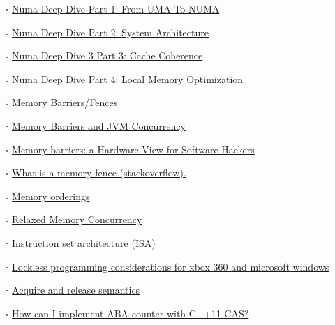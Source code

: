 \documentclass[openany, a4paper]{book}
\theoremstyle{break}
\theoremstyle{example}
\theoremstyle{note}
\theoremstyle{break}
\theoremstyle{exercise}
\begin{document}
\begin{itemize}
\item[{$\square$}] \href{https://frankdenneman.nl/2016/07/07/numa-deep-dive-part-1-uma-numa/}{Numa Deep Dive Part 1: From UMA To NUMA}
\item[{$\square$}] \href{https://frankdenneman.nl/2016/07/08/numa-deep-dive-part-2-system-architecture/}{Numa Deep Dive Part 2: System Architecture}
\item[{$\square$}] \href{https://frankdenneman.nl/2016/07/11/numa-deep-dive-part-3-cache-coherency/}{Numa Deep Dive 3 Part 3: Cache Coherence}
\item[{$\square$}] \href{https://frankdenneman.nl/2016/07/13/numa-deep-dive-4-local-memory-optimization/}{Numa Deep Dive Part 4: Local Memory Optimization}
\item[{$\square$}] \href{https://mechanical-sympathy.blogspot.com/2011/07/memory-barriersfences.html}{Memory Barriers/Fences}
\item[{$\square$}] \href{https://www.infoq.com/articles/memory\_barriers\_jvm\_concurrency/}{Memory Barriers and JVM Concurrency}
\item[{$\square$}] \href{http://www.rdrop.com/users/paulmck/scalability/paper/whymb.2010.07.23a.pdf}{Memory barriers: a Hardware View for Software Hackers}
\item[{$\square$}] \href{https://stackoverflow.com/questions/286629/what-is-a-memory-fence}{What is a memory fence (stackoverflow).}
\item[{$\square$}] \href{https://en.wikipedia.org/wiki/Memory\_ordering\#Compile-time\_memory\_ordering}{Memory orderings}
\item[{$\square$}] \href{https://www.cl.cam.ac.uk/\~pes20/weakmemory/}{Relaxed Memory Concurrency}
\item[{$\square$}] \href{https://en.wikipedia.org/wiki/Instruction\_set\_architecture\#Instructions}{Instruction set architecture (ISA)}
\item[{$\square$}] \href{https://docs.microsoft.com/en-us/windows/win32/dxtecharts/lockless-programming?redirectedfrom=MSDN}{Lockless programming considerations for xbox 360 and microsoft windows}
\item[{$\square$}] \href{https://preshing.com/20120913/acquire-and-release-semantics/}{Acquire and release semantics}
\item[{$\square$}] \href{https://stackoverflow.com/questions/38984153/how-can-i-implement-aba-counter-with-c11-cas/38991835\#38991835}{How can I implement ABA counter with C++11 CAS?}

\end{itemize}
\end{document}
